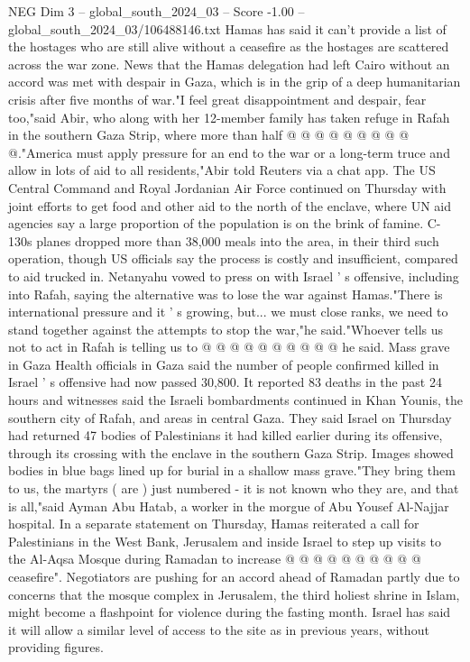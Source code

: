 \begin{textsample}{NEG Dim 3 – global\_south\_2024\_03 – Score -1.00 – global\_south\_2024\_03/106488146.txt}
Hamas has said it can't provide a list of the hostages who are still alive without a ceasefire as the hostages are scattered across the war zone.
News that the Hamas delegation had left Cairo without an accord was met with despair in Gaza, which is in the grip of a deep humanitarian crisis after five months of war."I feel great disappointment and despair, fear too,"said Abir, who along with her 12-member family has taken refuge in Rafah in the southern Gaza Strip, where more than half @ @ @ @ @ @ @ @ @ @."America must apply pressure for an end to the war or a long-term truce and allow in lots of aid to all residents,"Abir told Reuters via a chat app.
The US Central Command and Royal Jordanian Air Force continued on Thursday with joint efforts to get food and other aid to the north of the enclave, where UN aid agencies say a large proportion of the population is on the brink of famine.
C-130s planes dropped more than 38,000 meals into the area, in their third such operation, though US officials say the process is costly and insufficient, compared to aid trucked in.
Netanyahu vowed to press on with Israel ' s offensive, including into Rafah, saying the alternative was to lose the war against Hamas."There is international pressure and it ' s growing, but... we must close ranks, we need to stand together against the attempts to stop the war,"he said."Whoever tells us not to act in Rafah is telling us to @ @ @ @ @ @ @ @ @ @ he said.
Mass grave in Gaza Health officials in Gaza said the number of people confirmed killed in Israel ' s offensive had now passed 30,800.
It reported 83 deaths in the past 24 hours and witnesses said the Israeli bombardments continued in Khan Younis, the southern city of Rafah, and areas in central Gaza.
They said Israel on Thursday had returned 47 bodies of Palestinians it had killed earlier during its offensive, through its crossing with the enclave in the southern Gaza Strip.
Images showed bodies in blue bags lined up for burial in a shallow mass grave."They bring them to us, the martyrs ( are ) just numbered - it is not known who they are, and that is all,"said Ayman Abu Hatab, a worker in the morgue of Abu Yousef Al-Najjar hospital.
In a separate statement on Thursday, Hamas reiterated a call for Palestinians in the West Bank, Jerusalem and inside Israel to step up visits to the Al-Aqsa Mosque during Ramadan to increase @ @ @ @ @ @ @ @ @ @ ceasefire".
Negotiators are pushing for an accord ahead of Ramadan partly due to concerns that the mosque complex in Jerusalem, the third holiest shrine in Islam, might become a flashpoint for violence during the fasting month.
Israel has said it will allow a similar level of access to the site as in previous years, without providing figures.

\end{textsample}
